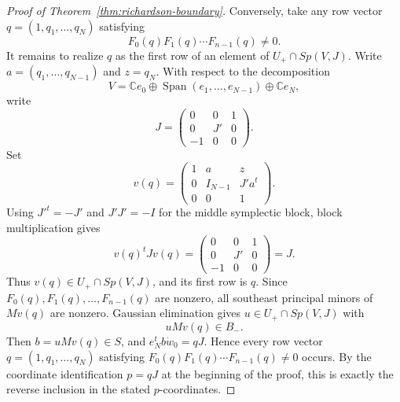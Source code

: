 \documentclass[10pt,a4paper]{amsart}
\newcommand{\CC}{\mathbb{C}}
\begin{document}
\begin{proof}[Proof of Theorem~\ref{thm:richardson-boundary}]
Conversely, take any row vector \(q=(1,q_1,\ldots,q_N)\) satisfying
\[
F_0(q)F_1(q)\cdots F_{n-1}(q)\ne0.
\]
It remains to realize \(q\) as the first row of an element of \(U_+\cap Sp(V,J)\). Write \(a=(q_1,\ldots,q_{N-1})\) and \(z=q_N\). With respect to the decomposition
\[
V=\CC e_0\oplus \operatorname{Span}(e_1,\ldots,e_{N-1})\oplus \CC e_N,
\]
write
\[
J=\begin{pmatrix}
0&0&1\\
0&J'&0\\
-1&0&0
\end{pmatrix}.
\]
Set
\[
v(q)=
\begin{pmatrix}
1&a&z\\
0&I_{N-1}&J'a^t\\
0&0&1
\end{pmatrix}.
\]
Using \(J'^t=-J'\) and \(J'J'=-I\) for the middle symplectic block, block multiplication gives
\[
v(q)^tJv(q)=
\begin{pmatrix}
0&0&1\\
0&J'&0\\
-1&0&0
\end{pmatrix}
=J.
\]
Thus \(v(q)\in U_+\cap Sp(V,J)\), and its first row is \(q\). Since \(F_0(q),F_1(q),\ldots,F_{n-1}(q)\) are nonzero, all southeast principal minors of \(Mv(q)\) are nonzero. Gaussian elimination gives \(u\in U_+\cap Sp(V,J)\) with
\[
uMv(q)\in B_-.
\]
Then \(b=uMv(q)\in S\), and \(e_N^tb\dot w_0=qJ\). Hence every row vector \(q=(1,q_1,\ldots,q_N)\) satisfying \(F_0(q)F_1(q)\cdots F_{n-1}(q)\ne0\) occurs. By the coordinate identification \(p=qJ\) at the beginning of the proof, this is exactly the reverse inclusion in the stated \(p\)-coordinates.
\end{proof}
\end{document}

